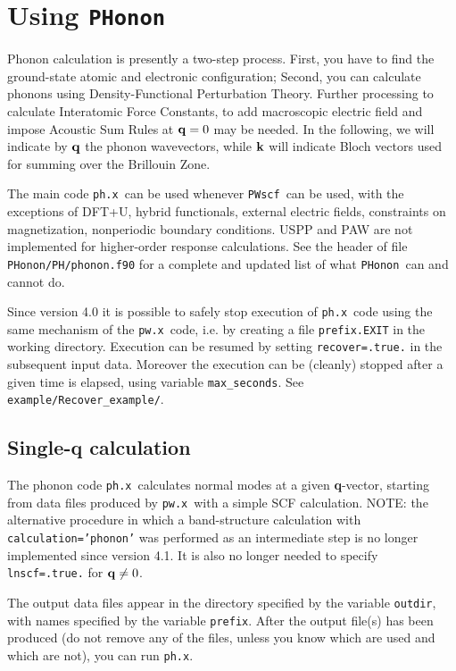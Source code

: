\documentclass[12pt,a4paper]{article}
\def\pwx{\texttt{pw.x}}
\def\phx{\texttt{ph.x}}
\def\PWscf{\texttt{PWscf}}
\def\PHonon{\texttt{PHonon}}
\begin{document}
\section{Using \PHonon}

Phonon calculation is presently a two-step process.
First, you have to find the ground-state atomic and electronic configuration;
Second, you can calculate phonons using Density-Functional Perturbation Theory.
Further processing to calculate Interatomic Force Constants, to add macroscopic
electric field and impose Acoustic Sum Rules at ${\bf q}=0$ may be needed.
In the following, we will indicate by ${\bf q}$ the phonon wavevectors, 
while ${\bf k}$ will indicate Bloch vectors used for summing over the 
Brillouin Zone.

The main code \phx\ can be used whenever \PWscf\ can be used, 
with the exceptions of DFT+U, hybrid functionals, external electric fields,
constraints on magnetization, nonperiodic boundary conditions.
USPP and PAW are not implemented for higher-order response calculations.
See the header of file \texttt{PHonon/PH/phonon.f90} for a complete and
updated list of what \PHonon\ can and cannot do.

Since version 4.0 it is possible to safely stop execution of \phx\ code using
the same mechanism of the \pwx\ code, i.e. by creating a file 
\texttt{prefix.EXIT} in the working directory. Execution can be resumed by 
setting \texttt{recover=.true.} in the subsequent input data.
Moreover the execution can be (cleanly) stopped after a given time is elapsed,
using variable \texttt{max\_seconds}. See \texttt{example/Recover\_example/}.

\subsection{Single-{\bf q} calculation}

The phonon code \phx\ calculates normal modes at a given {\bf q}-vector, 
starting from data files produced by \pwx\ with a simple SCF calculation.
NOTE: the alternative procedure in which a band-structure calculation 
with \texttt{calculation='phonon'} was performed as an intermediate step is no
longer implemented since version 4.1. It is also no longer needed to
specify \texttt{lnscf=.true.} for ${\bf q}\ne 0$.

The output data files appear in the directory specified by the
variable {\tt outdir}, with names specified by the variable 
{\tt prefix}. After the output file(s) has been produced (do not remove 
any of the files, unless you know which are used and which are not), 
you can run \phx.
    
\end{document}
